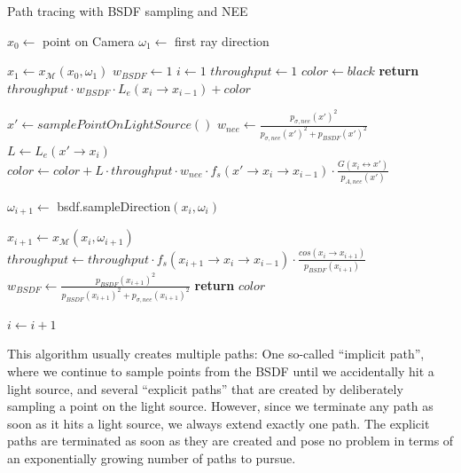 \begin{algorithm}
\caption{Path tracing with BSDF sampling and NEE}
\label{ptBSDF}
\begin{algorithmic}[1]

\State $x_0 \gets $ point on Camera
\State $\omega_1 \gets $ first ray direction

\State $x_1 \gets x_\mathcal{M}(x_0,\omega_1)$
\State $w_{BSDF} \gets 1$
\State $i \gets 1$
\State $throughput \gets 1$
\State $color \gets black$
\State \textbf{return} $throughput  \cdot w_{BSDF} \cdot L_e(x_i \rightarrow x_{i-1}) + color$

\Else

\State
\State $x' \gets samplePointOnLightSource()$
\State $w_{nee} \gets \frac{p_{\sigma,nee}(x')^2}{p_{\sigma,nee}(x')^2 + p_{BSDF}(x')^2}$
\State $L \gets L_e(x' \rightarrow x_i)$
\State $color \gets color + L \cdot throughput \cdot w_{nee} \cdot f_s(x' \rightarrow x_i \rightarrow x_{i-1}) \cdot \frac{G(x_i \leftrightarrow x')}{p_{A,nee}(x')}$

\EndIf
\State
\State $\omega_{i+1} \gets $ bsdf.sampleDirection$(x_i,\omega_i)$

\State $x_{i+1} \gets x_\mathcal{M}(x_i,\omega_{i+1})$
\State $throughput \gets throughput \cdot f_s(x_{i+1} \rightarrow x_i \rightarrow x_{i-1})\cdot \frac{cos(x_i \rightarrow x_{i+1})}{p_{BSDF}(x_{i+1})}$
\State $w_{BSDF} \gets \frac{p_{BSDF}(x_{i+1})^2}{p_{BSDF}(x_{i+1})^2 + p_{\sigma,nee}(x_{i+1})^2}$
\Else
\State \textbf{return} $color$

\EndIf

\State $i \gets i+1$
\EndIf
\EndWhile

\end{algorithmic}
\end{algorithm}
\pagebreak


This algorithm usually creates multiple paths: One so-called ``implicit path'', where we continue to sample points from the BSDF until we accidentally hit a light source, and several ``explicit paths'' that are created by deliberately sampling a point on the light source. However, since we terminate any path as soon as it hits a light source, we always extend exactly one path. The explicit paths are terminated as soon as they are created and pose no problem in terms of an exponentially growing number of paths to pursue.






